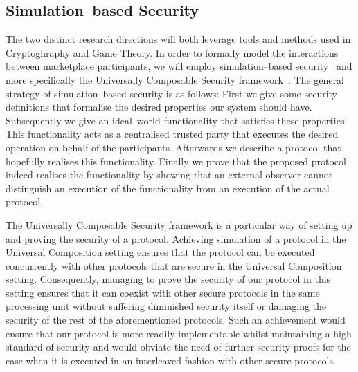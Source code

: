 \subsection{Simulation--based Security}
  The two distinct research directions will both leverage tools and methods used in
  Cryptoghraphy and Game Theory. In order to formally model the interactions between
  marketplace participants, we will employ simulation--based security~\cite{simulate}
  and more specifically the Universally Composable Security framework~\cite{uc}. The
  general strategy of simulation--based security is as follows: First we give some
  security definitions that formalise the desired properties our system should have.
  Subsequently we give an ideal--world functionality that satisfies these properties.
  This functionality acts as a centralised trusted party that executes the desired
  operation on behalf of the participants. Afterwards we describe a protocol that
  hopefully realises this functionality. Finally we prove that the proposed protocol
  indeed realises the functionality by showing that an external observer cannot
  distinguish an execution of the functionality from an execution of the actual
  protocol.

  The Universally Composable Security framework is a particular way of setting up and
  proving the security of a protocol. Achieving simulation of a protocol in the
  Universal Composition setting ensures that the protocol can be executed concurrently
  with other protocols that are secure in the Universal Composition setting.
  Consequently, managing to prove the security of our protocol in this setting ensures
  that it can coexist with other secure protocols in the same processing unit without
  suffering diminished security itself or damaging the security of the rest of the
  aforementioned protocols. Such an achievement would ensure that our protocol is more
  readily implementable whilst maintaining a high standard of security and would obviate
  the need of further security proofs for the case when it is executed in an interleaved
  fashion with other secure protocols.

